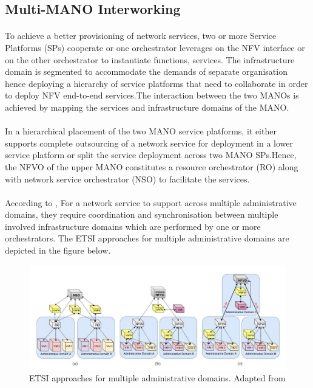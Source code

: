 \subsection{Multi-MANO Interworking}
\paragraph{}To achieve a better provisioning of network services, two or more Service Platforms (SPs) cooperate or one orchestrator leverages on the NFV interface or on the other orchestrator to instantiate functions, services. The infrastructure domain is segmented to accommodate the demands of separate organisation hence deploying a hierarchy of service platforms that need to collaborate in order to deploy NFV end-to-end services.The interaction between the two MANOs is achieved by mapping the services and infrastructure domains of the MANO. 

\paragraph{}In a hierarchical placement of the two MANO service platforms, it either supports complete outsourcing of a network service for deployment in a lower service platform or split the service deployment across two MANO SPs.Hence, the NFVO of the upper MANO constitutes a resource orchestrator (RO) along with network service orchestrator (NSO) to facilitate the services.



\paragraph{}According to \cite{de2018network} , For a network service to support across multiple administrative domains, they require coordination and synchronisation between multiple involved infrastructure domains which are performed by one or more orchestrators. The ETSI approaches for multiple administrative domains are depicted in the figure below.

\begin{figure}
	\centering
	\includegraphics[width=0.8\linewidth]{"figures/ETSI approaches"}
	\caption{ETSI approaches for multiple administrative domains. Adapted from \cite{de2018network}}
	\label{fig:etsi-approaches}
\end{figure}


